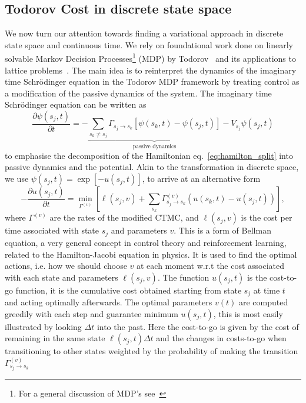 \subsection{Todorov Cost in discrete state space}
\label{subsec:todorov}
We now turn our attention towards finding a variational approach in discrete state space and continuous time. We rely on foundational work done on linearly solvable Markov Decision Processes\footnote{For a general discussion of MDP's see~\cite{sutton2018reinforcement}} (MDP) by Todorov~\cite{todorov2007linearly, todorov2009efficient} and its applications to lattice problems~\cite{gispen2020ground}. The main idea is to reinterpret the dynamics of the imaginary time Schr\" odinger equation in the Todorov MDP framework by treating control as a modification of the passive dynamics of the system. The imaginary time Schr\" odinger equation can be written as
\begin{equation}
	\label{eq:sch_split}
	\frac{\partial \psi(s_j, t)}{\partial t}=-\underbrace{\sum_{s_k \neq s_j} \Gamma_{s_j \rightarrow s_k}\left[\psi(s_k, t)-\psi(s_j, t)\right]}_{\text{passive dynamics}}
	-V_{s_j} \psi(s_j, t)
\end{equation}
to emphasise the decomposition of the Hamiltonian eq.~\eqref{eq:hamilton_split} into passive dynamics and the potential. Akin to the transformation in discrete space, we use $\psi(s_j, t)=\exp[-u(s_j, t)]$, to arrive at an alternative form
\begin{equation}
	\label{eq:bellman_sch}
	-\frac{\partial u(s_j, t)}{\partial t}=\min _{\Gamma^{(v)}}\left[\ell(s_j, v)+\sum_{s_k} \Gamma_{s_j \rightarrow s_k}^{(v)}(u(s_k, t)-u(s_j, t))\right],
\end{equation}
where $\Gamma^{(v)}$ are the rates of the modified CTMC, and $\ell(s_j, v)$ is the cost per time associated with state $s_j$ and parameters $v$.
This is a form of Bellman equation, a very general concept in control theory and reinforcement learning, related to the Hamilton-Jacobi equation in physics. It is used to find the optimal actions, i.e. how we should choose $v$ at each moment w.r.t the cost associated with each state and parameters $\ell(s_j, v)$. The function $u(s_j, t)$ is the cost-to-go function, it is the cumulative cost obtained starting from state $s_j$ at time $t$ and acting optimally afterwards. The optimal parameters $v(t)$ are computed greedily with each step and guarantee minimum $u(s_j, t)$, this is most easily illustrated by looking $\Delta t$ into the past. Here the cost-to-go is given by the cost of remaining in the same state $\ell(s_j, t) \Delta t$ and the changes in costs-to-go when transitioning to other states weighted by the probability of making the transition $\Gamma^{(v)}_{s_j \rightarrow s_k}$
